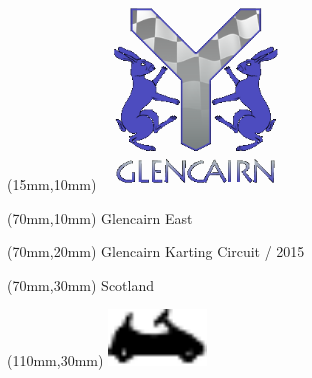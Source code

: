 \null\newpage
\begin{textblock*}{50mm}(15mm,10mm)%
\includegraphics[width=50mm]{LG/GLE.png}
\end{textblock*}
\begin{textblock*}{130mm}(70mm,10mm)%
{\fontsize{20}{20}\selectfont Glencairn East}\\
\end{textblock*}
\begin{textblock*}{120mm}(70mm,20mm)%
{\fontsize{16}{16}\selectfont Glencairn Karting Circuit / 2015}\\
\end{textblock*}
\begin{textblock*}{120mm}(70mm,30mm)%
{\fontsize{12}{12}\selectfont Scotland}
\end{textblock*}
\begin{textblock*}{30mm}(110mm,30mm)%
\centering
\includegraphics[height=15mm]{icons/kart.pdf}
\end{textblock*}
